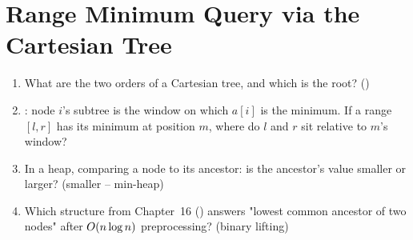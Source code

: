 \section{Range Minimum Query via the Cartesian Tree}\label{sec:c26-rmq}

\begin{previouslybox}
\begin{enumerate}[nosep, leftmargin=1.6em]
  \item What are the two orders of a Cartesian tree, and which is the root? ()
  \item {}: node $i$'s subtree is the window on which $a[i]$ is the minimum. If a range
        $[l,r]$ has its minimum at position $m$, where do $l$ and $r$ sit relative to $m$'s window?
  \item In a heap, comparing a node to its ancestor: is the ancestor's value smaller or larger? (smaller --
        min-heap)
  \item Which structure from Chapter~16 () answers "lowest common ancestor of two nodes" after
        $O(n\log n)$ preprocessing? (binary lifting)
\end{enumerate}
\end{previouslybox}

